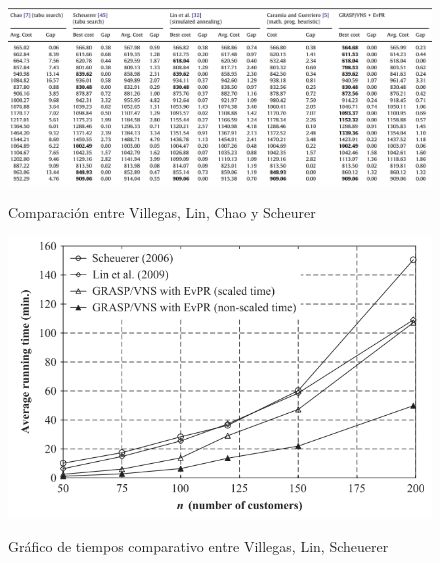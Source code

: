 \documentclass[letter, 10pt]{article}
\begin{document}
\begin{figure}[h]
    \centering
    \caption{Comparación entre Villegas, Lin, Chao y Scheurer}
    \vspace{0.5cm}
    \includegraphics[scale=0.53]{Images/ComVillegas.png}
    \label{fig:Villegas}
\end{figure}
\begin{figure}[h]
    \centering
    \caption{Gráfico de tiempos comparativo entre Villegas, Lin, Scheuerer}
    \vspace{0.5cm}
    \includegraphics[scale=0.53]{Images/Grafico.png}
    \label{fig:grafico}
\end{figure}

\newpage
\end{document}

